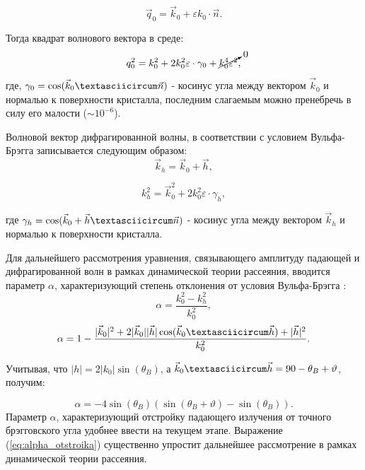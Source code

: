  \begin{equation}
   \vec{q}_0 = \vec{k}_0 + \varepsilon k_0 \cdot \vec{n}.
  \end{equation}

Тогда квадрат волнового вектора в среде:
\begin{equation}
   q_0^2 = k_0^2 + 2k_0^2 \varepsilon \cdot \gamma_0 + \cancelto{0}{k_0^4  \varepsilon^2},
   \label{eq:k_0_squred}
 \end{equation}
\noindent
где, $\gamma_0 = \cos(\vec{k}_0 \textasciicircum \vec{n})$ - косинус угла между вектором $\vec{k}_0$ и нормалью к поверхности кристалла,
последним слагаемым можно пренебречь в силу его малости ($\sim 10^{-6}$).

  Волновой вектор дифрагированной волны, в соответствии с условием Вульфа-Брэгга записывается следующим образом:
  $$\vec{k}_h = \vec{k}_0+\vec{h},$$

  \begin{equation}
     k_h^2 = \vec{k}_0^2+2k_0^2 \varepsilon \cdot \gamma_h,
     \label{eq:k_h_squred}
   \end{equation}
\noindent

где $\gamma_h = \cos(\vec{k}_0+ \vec{h} \textasciicircum \vec{n})$ - косинус угла между вектором $\vec{k}_h$ и нормалью к поверхности кристалла.

Для дальнейшего рассмотрения уравнения, связывающего амплитуду падающей и дифрагированной волн в рамках
динамической теории рассеяния, вводится параметр $\alpha$,
характеризующий степень отклонения от условия Вульфа-Брэгга \cite{Bushuev_Oreshko_2002}:
\begin{equation}
   \alpha = \frac{k_0^2-k_h^2}{k_0^2},
   \label{eq:alpha}
\end{equation}
$$  \alpha = 1 - \frac{|\vec{k}_0|^2+2|\vec{k}_0||\vec{h}|\cos(\vec{k}_0 \textasciicircum \vec{h})+|\vec{h}|^2}{k_0^2}.$$

Учитывая, что $ |h| = 2|k_0| \sin(\theta_B) $, а $\vec{k}_0 \textasciicircum \vec{h} = 90-\theta_B+\vartheta$, получим:

\begin{equation}
   \alpha = -4\sin(\theta_B)(\sin(\theta_B+\vartheta)-\sin(\theta_B)).
   \label{eq:alpha_otstroika}
\end{equation}
\noindent
Параметр $\alpha$, характеризующий отстройку падающего излучения от точного брэгговского угла удобнее ввести на
текущем этапе. Выражение (\ref{eq:alpha_otstroika}) существенно упростит
 дальнейшее рассмотрение в рамках динамической теории рассеяния.
